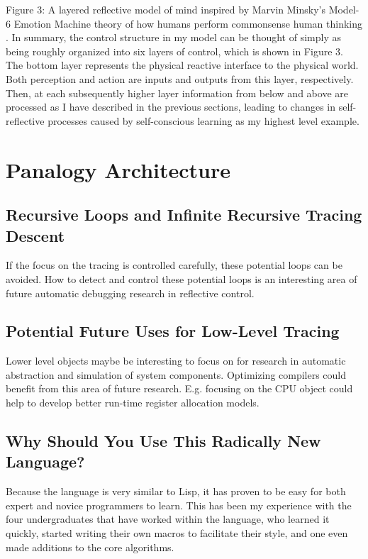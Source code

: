 Figure 3: A layered reflective model of mind inspired by Marvin
Minsky's Model-6 Emotion Machine theory of how humans perform
commonsense human thinking \citep{minsky:2006}.  In summary, the
control structure in my model can be thought of simply as being
roughly organized into six layers of control, which is shown in Figure
3. The bottom layer represents the physical reactive interface to the
physical world. Both perception and action are inputs and outputs from
this layer, respectively. Then, at each subsequently higher layer
information from below and above are processed as I have described in
the previous sections, leading to changes in self-reflective processes
caused by self-conscious learning as my highest level example.




\section{Panalogy Architecture}



\subsection{Recursive Loops and Infinite Recursive Tracing Descent}

If the focus on the tracing is controlled carefully, these potential
loops can be avoided.  How to detect and control these potential loops
is an interesting area of future automatic debugging research in
reflective control.

\subsection{Potential Future Uses for Low-Level Tracing}

Lower level objects maybe be interesting to focus on for research in
automatic abstraction and simulation of system components.  Optimizing
compilers could benefit from this area of future research.  E.g.
focusing on the CPU object could help to develop better run-time
register allocation models.

\subsection{Why Should You Use This Radically New Language?}

Because the language is very similar to Lisp, it has proven to be easy
for both expert and novice programmers to learn.  This has been my
experience with the four undergraduates that have worked within the
language, who learned it quickly, started writing their own macros to
facilitate their style, and one even made additions to the core
algorithms.

